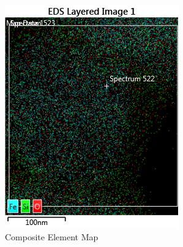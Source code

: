 \documentclass[12pt,a4paper]{article}
\begin{document}
\lipsum[6] %

\lipsum[6] %

\lipsum[6] %

\begin{figure}[htbp]
  \centering
  \begin{subfigure}[b]{0.35\textwidth}
    \includegraphics[width=\textwidth]{Data/Map.png}
    \caption{Composite Element Map}
    \label{fig:map}
  \end{subfigure}
  \begin{subfigure}[b]{0.35\textwidth}

\end{subfigure}
\end{figure}
\end{document}
